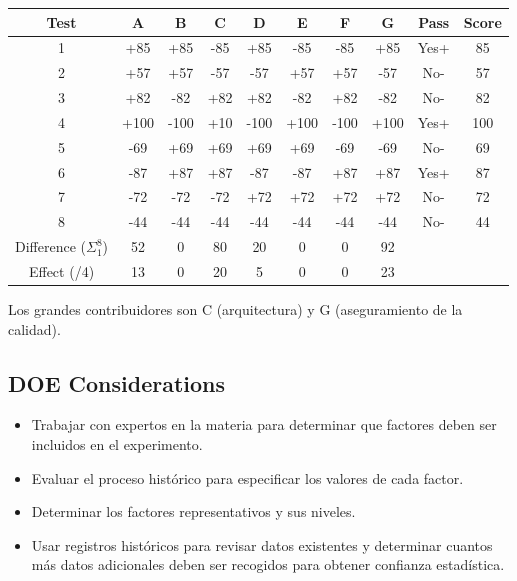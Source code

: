\documentclass[]{article}
\begin{document}
\begin{table}[H]
	\begin{center}
		\begin{tabular}{|c|c|c|c|c|c|c|c|c|c|}
			\hline Test & A & B & C & D & E & F & G & Pass & Score \\
			\hline 1 & +85 & +85 & -85 & +85 & -85 & -85 & +85 & Yes+& 85 \\
			\hline 2 & +57 & +57 & -57 & -57 & +57 & +57 & -57 & No- & 57 \\
			\hline 3 & +82 & -82 & +82 & +82 & -82 & +82 & -82 & No- & 82 \\
			\hline 4 & +100 & -100 & +10 & -100 & +100 & -100 & +100 & Yes+& 100 \\
			\hline 5 & -69 & +69 & +69 & +69 & +69 & -69 & -69 & No- & 69 \\
			\hline 6 & -87 & +87 & +87 & -87 & -87 & +87 & +87 & Yes+& 87 \\
			\hline 7 & -72 & -72 & -72 & +72 & +72& +72 & +72 & No- & 72 \\
			\hline 8 & -44 & -44 & -44 & -44 & -44 & -44 & -44 & No- & 44 \\
			\hline 
			\hline Difference ($\Sigma_1^8$) & 52 & 0 & 80 & 20 & 0 & 0 & 92 &  &  \\
			\hline Effect (/4) & 13 & 0 & 20 & 5 & 0 & 0 & 23 & & \\
			\hline
		\end{tabular}
	\end{center}
\end{table}

Los grandes contribuidores son C (arquitectura) y G (aseguramiento de la calidad).

\subsection{DOE Considerations}

\begin{itemize}
	\item Trabajar con expertos en la materia para determinar que factores deben ser incluidos en el experimento.
	\item Evaluar el proceso histórico para especificar los valores de cada factor.
	\item Determinar los factores representativos y sus niveles.
	\item Usar registros históricos para revisar datos existentes y determinar cuantos más datos adicionales deben ser recogidos para obtener confianza estadística.
\end{itemize}
\end{document}
